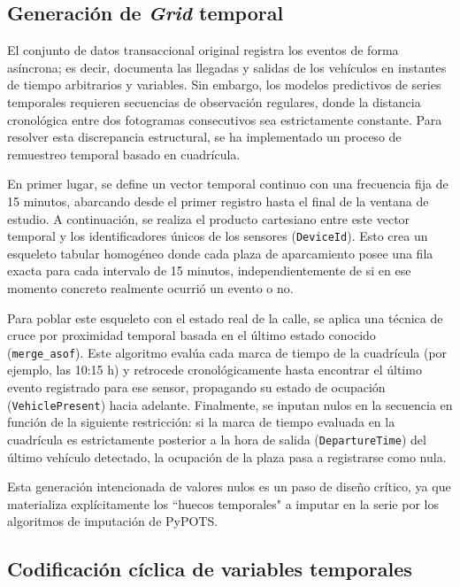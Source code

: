 \subsection{Generación de \textit{Grid} temporal}
\label{subsec:regularizacion_grid}

El conjunto de datos transaccional original registra los eventos de forma asíncrona; es decir, documenta las llegadas y salidas de los vehículos en instantes de tiempo arbitrarios y variables. Sin embargo, los modelos predictivos de series temporales requieren secuencias de observación regulares, donde la distancia cronológica entre dos fotogramas consecutivos sea estrictamente constante. Para resolver esta discrepancia estructural, se ha implementado un proceso de remuestreo temporal basado en cuadrícula.

En primer lugar, se define un vector temporal continuo con una frecuencia fija de 15 minutos, abarcando desde el primer registro hasta el final de la ventana de estudio. A continuación, se realiza el producto cartesiano entre este vector temporal y los identificadores únicos de los sensores (\texttt{DeviceId}). Esto crea un esqueleto tabular homogéneo donde cada plaza de aparcamiento posee una fila exacta para cada intervalo de 15 minutos, independientemente de si en ese momento concreto realmente ocurrió un evento o no.

Para poblar este esqueleto con el estado real de la calle, se aplica una técnica de cruce por proximidad temporal basada en el último estado conocido (\texttt{merge\_asof}). Este algoritmo evalúa cada marca de tiempo de la cuadrícula (por ejemplo, las 10:15 h) y retrocede cronológicamente hasta encontrar el último evento registrado para ese sensor, propagando su estado de ocupación (\texttt{VehiclePresent}) hacia adelante. Finalmente, se inputan nulos en la secuencia en función de la siguiente restricción: si la marca de tiempo evaluada en la cuadrícula es estrictamente posterior a la hora de salida (\texttt{DepartureTime}) del último vehículo detectado, la ocupación de la plaza pasa a registrarse como nula. 

Esta generación intencionada de valores nulos es un paso de diseño crítico, ya que materializa explícitamente los ``huecos temporales" a imputar en la serie por los algoritmos de imputación de PyPOTS.


\subsection{Codificación cíclica de variables temporales}
\label{subsec:codificacion_ciclica}

